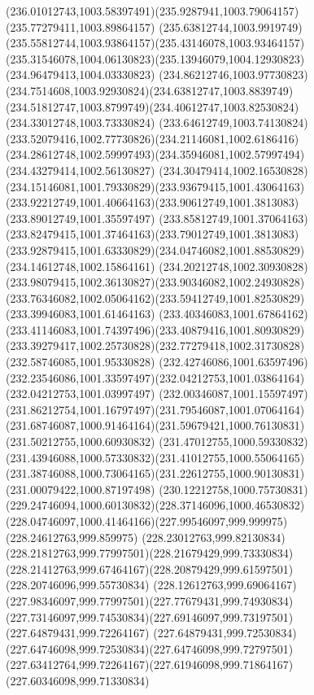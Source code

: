 {{		\curveto(236.01012743,1003.58397491)(235.9287941,1003.79064157)(235.77279411,1003.89864157)
		\curveto(235.63812744,1003.9919749)(235.55812744,1003.93864157)(235.43146078,1003.93464157)
		\curveto(235.31546078,1004.06130823)(235.13946079,1004.12930823)(234.96479413,1004.03330823)
		\curveto(234.86212746,1003.97730823)(234.7514608,1003.92930824)(234.63812747,1003.8839749)
		\curveto(234.51812747,1003.8799749)(234.40612747,1003.82530824)(234.33012748,1003.73330824)
		\curveto(233.64612749,1003.74130824)(233.52079416,1002.77730826)(234.21146081,1002.6186416)
		\curveto(234.28612748,1002.59997493)(234.35946081,1002.57997494)(234.43279414,1002.56130827)
		\curveto(234.30479414,1002.16530828)(234.15146081,1001.79330829)(233.93679415,1001.43064163)
		\curveto(233.92212749,1001.40664163)(233.90612749,1001.3813083)(233.89012749,1001.35597497)
		\curveto(233.85812749,1001.37064163)(233.82479415,1001.37464163)(233.79012749,1001.3813083)
		\curveto(233.92879415,1001.63330829)(234.04746082,1001.88530829)(234.14612748,1002.15864161)
		\curveto(234.20212748,1002.30930828)(233.98079415,1002.36130827)(233.90346082,1002.24930828)
		\curveto(233.76346082,1002.05064162)(233.59412749,1001.82530829)(233.39946083,1001.61464163)
		\curveto(233.40346083,1001.67864162)(233.41146083,1001.74397496)(233.40879416,1001.80930829)
		\curveto(233.39279417,1002.25730828)(232.77279418,1002.31730828)(232.58746085,1001.95330828)
		\curveto(232.42746086,1001.63597496)(232.23546086,1001.33597497)(232.04212753,1001.03864164)
		\lineto(232.04212753,1001.03997497)
		\curveto(232.00346087,1001.15597497)(231.86212754,1001.16797497)(231.79546087,1001.07064164)
		\curveto(231.68746087,1000.91464164)(231.59679421,1000.76130831)(231.50212755,1000.60930832)
		\curveto(231.47012755,1000.59330832)(231.43946088,1000.57330832)(231.41012755,1000.55064165)
		\curveto(231.38746088,1000.73064165)(231.22612755,1000.90130831)(231.00079422,1000.87197498)
		\curveto(230.12212758,1000.75730831)(229.24746094,1000.60130832)(228.37146096,1000.46530832)
		\curveto(228.04746097,1000.41464166)(227.99546097,999.999975)(228.24612763,999.859975)
		\curveto(228.23012763,999.82130834)(228.21812763,999.77997501)(228.21679429,999.73330834)
		\curveto(228.21412763,999.67464167)(228.20879429,999.61597501)(228.20746096,999.55730834)
		\curveto(228.12612763,999.69064167)(227.98346097,999.77997501)(227.77679431,999.74930834)
		\curveto(227.73146097,999.74530834)(227.69146097,999.73197501)(227.64879431,999.72264167)
		\curveto(227.64879431,999.72530834)(227.64746098,999.72530834)(227.64746098,999.72797501)
		\curveto(227.63412764,999.72264167)(227.61946098,999.71864167)(227.60346098,999.71330834)
}}
